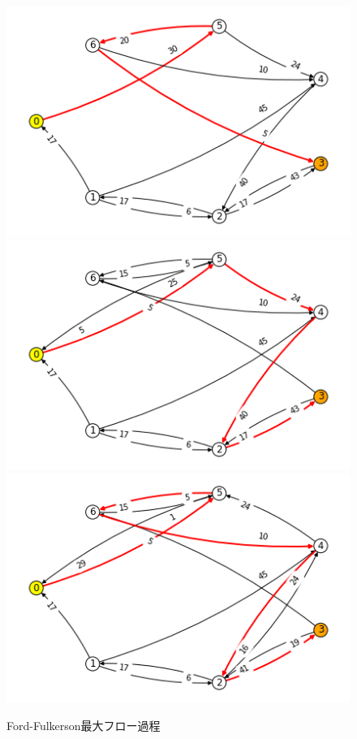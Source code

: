 \documentclass{report}
\begin{document}
\begin{CJK}{UTF8}{min}
\begin{figure}
        \includegraphics[width=.49\textwidth]{data/ex11-MF-2.png}
        \\[\smallskipamount]
        \includegraphics[width=.49\textwidth]{data/ex11-MF-3.png}\hfill
        \includegraphics[width=.49\textwidth]{data/ex11-MF-4.png}
        \caption{Ford-Fulkerson最大フロー過程}
    \end{figure}
\end{CJK}
\end{document}
